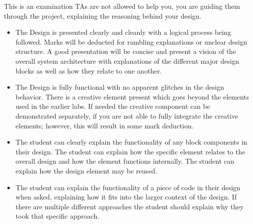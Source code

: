 This is an examination TAs are not allowed to help you, you are guiding them through the project, explaining the reasoning behind your design. 

\begin{itemize}
    \item The Design is presented clearly and cleanly with a logical process being followed. Marks will be deducted for rambling explanations or unclear design structure. A good presentation will be concise and present a vision of the overall system architecture with explanations of the different major design blocks as well as how they relate to one another. \begin{flushright}
    \end{flushright}
    \item The Design is fully functional with no apparent glitches in the design behavior. There is a creative element present which goes beyond the elements used in the earlier labs. If needed the creative component can be demonstrated separately, if you are not able to fully integrate the creative elements; however, this will result in some mark deduction. \begin{flushright}
    \end{flushright}
    \item The student can clearly explain the functionality of any block components in their design. The student can explain how the specific element relates to the overall design and how the element functions internally. The student can explain how the design element may be reused. \begin{flushright}
    \end{flushright}
    \item The student can explain the functionality of a piece of code in their design when asked, explaining how it fits into the larger context of the design. If there are multiple different approaches the student should explain why they took that specific approach.\begin{flushright}
    \end{flushright}
\end{itemize}

